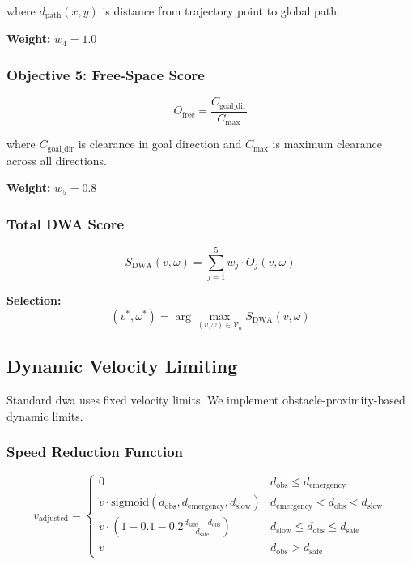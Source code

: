 where $d_{\text{path}}(x, y)$ is distance from trajectory point to global path.

\textbf{Weight:} $w_4 = 1.0$

\subsubsection{Objective 5: Free-Space Score}
\begin{equation}
O_{\text{free}} = \frac{C_{\text{goal\_dir}}}{C_{\max}}
\label{eq:dwa_free}
\end{equation}

where $C_{\text{goal\_dir}}$ is clearance in goal direction and $C_{\max}$ is maximum clearance across all directions.

\textbf{Weight:} $w_5 = 0.8$

\subsubsection{Total DWA Score}
\begin{equation}
S_{\text{DWA}}(v, \omega) = \sum_{j=1}^{5} w_j \cdot O_j(v, \omega)
\label{eq:total_dwa_score}
\end{equation}

\textbf{Selection:}
\begin{equation}
(v^*, \omega^*) = \arg\max_{(v, \omega) \in \mathcal{V}_a} S_{\text{DWA}}(v, \omega)
\label{eq:velocity_selection}
\end{equation}

\subsection{Dynamic Velocity Limiting}

Standard \acrshort{dwa} uses fixed velocity limits. We implement obstacle-proximity-based dynamic limits.

\subsubsection{Speed Reduction Function}

\begin{equation}
v_{\text{adjusted}} = \begin{cases}
0 & d_{\text{obs}} \leq d_{\text{emergency}} \\
v \cdot \text{sigmoid}(d_{\text{obs}}, d_{\text{emergency}}, d_{\text{slow}}) & d_{\text{emergency}} < d_{\text{obs}} < d_{\text{slow}} \\
v \cdot (1 - 0.1 - 0.2\frac{d_{\text{safe}} - d_{\text{obs}}}{d_{\text{safe}}}) & d_{\text{slow}} \leq d_{\text{obs}} \leq d_{\text{safe}} \\
v & d_{\text{obs}} > d_{\text{safe}}
\end{cases}
\label{eq:speed_reduction}
\end{equation}

